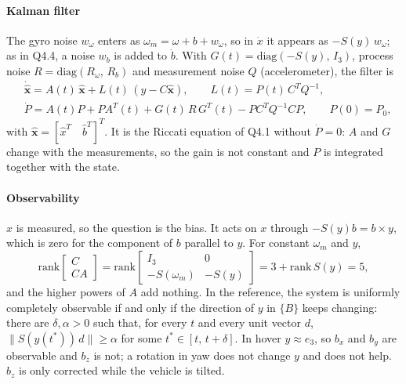 \documentclass[10pt,a4paper]{article}
\newenvironment{answer}{%
  \begin{tcolorbox}[breakable,enhanced,colback=white,colframe=greyline,
    boxrule=0.6pt,arc=2pt,left=8pt,right=8pt,top=7pt,bottom=7pt,
    before skip=0pt,after skip=12pt]
}{\end{tcolorbox}}
\newcommand{\fB}{\{B\}}
\begin{document}
\begin{answer}
\paragraph{Kalman filter}
The gyro noise $w_\omega$ enters as $\omega_m = \omega + b + w_\omega$,
so in $\dot x$ it appears as $-S(y)\,w_\omega$; as in Q4.4, a noise
$w_b$ is added to $\dot b$. With $G(t) = \mathrm{diag}(-S(y),\, I_3)$,
process noise $R = \mathrm{diag}(R_\omega,\, R_b)$ and measurement noise
$Q$ (accelerometer), the filter is
\[
\begin{aligned}
  &\dot{\hat{\mathbf{x}}} = A(t)\,\hat{\mathbf{x}} + L(t)\,(y - C\hat{\mathbf{x}}),
  \qquad L(t) = P(t)\,C^TQ^{-1},\\
  &\dot P = A(t)P + PA^T(t) + G(t)\,R\,G^T(t) - PC^TQ^{-1}CP, \qquad P(0)=P_0 ,
\end{aligned}
\]
with $\hat{\mathbf{x}} = [\hat x^T \quad \hat b^T]^T$. It is the
Riccati equation of Q4.1 without $\dot P = 0$: $A$ and $G$ change with
the measurements, so the gain is not constant and $P$ is integrated
together with the state.

\paragraph{Observability}
$x$ is measured, so the question is the bias. It acts on $x$ through
$-S(y)b = b\times y$, which is zero for the component of $b$ parallel to
$y$. For constant $\omega_m$ and $y$,
\[
  \mathrm{rank}\begin{bmatrix} C\\ CA \end{bmatrix}
  = \mathrm{rank}\begin{bmatrix} I_3 & 0\\ -S(\omega_m) & -S(y) \end{bmatrix}
  = 3 + \mathrm{rank}\,S(y) = 5 ,
\]
and the higher powers of $A$ add nothing. In the reference, the system is
uniformly completely observable if and only if the direction of $y$ in
$\fB$ keeps changing: there are $\delta,\alpha>0$ such that, for every
$t$ and every unit vector $d$, $\|S(y(t^*))\,d\|\geq\alpha$ for some
$t^*\in[t,\,t+\delta]$. In hover $y\approx e_3$, so $b_x$ and $b_y$ are
observable and $b_z$ is not; a rotation in yaw does not change $y$ and
does not help. $b_z$ is only corrected while the vehicle is tilted.


\end{answer}
\end{document}

